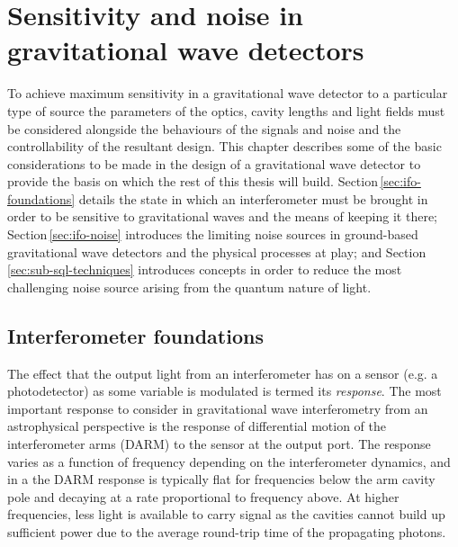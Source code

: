 \chapter{Sensitivity and noise in gravitational wave detectors}
\label{c:instrumentation}

To achieve maximum sensitivity in a gravitational wave detector to a particular type of source the parameters of the optics, cavity lengths and light fields must be considered alongside the behaviours of the signals and noise and the controllability of the resultant design. This chapter describes some of the basic considerations to be made in the design of a gravitational wave detector to provide the basis on which the rest of this thesis will build. Section\,\ref{sec:ifo-foundations} details the state in which an interferometer must be brought in order to be sensitive to gravitational waves and the means of keeping it there; Section\,\ref{sec:ifo-noise} introduces the limiting noise sources in ground-based gravitational wave detectors and the physical processes at play; and Section\,\ref{sec:sub-sql-techniques} introduces concepts in order to reduce the most challenging noise source arising from the quantum nature of light.

\section{\label{sec:ifo-foundations}Interferometer foundations}
The effect that the output light from an interferometer has on a sensor (e.g. a photodetector) as some variable is modulated is termed its \emph{response}. The most important response to consider in gravitational wave interferometry from an astrophysical perspective is the response of differential motion of the interferometer arms (\gls{DARM}) to the sensor at the output port. The response varies as a function of frequency depending on the interferometer dynamics, and in a \FPMI{} the \gls{DARM} response is typically flat for frequencies below the arm cavity pole and decaying at a rate proportional to frequency above. At higher frequencies, less light is available to carry signal as the cavities cannot build up sufficient power due to the average round-trip time of the propagating photons.

